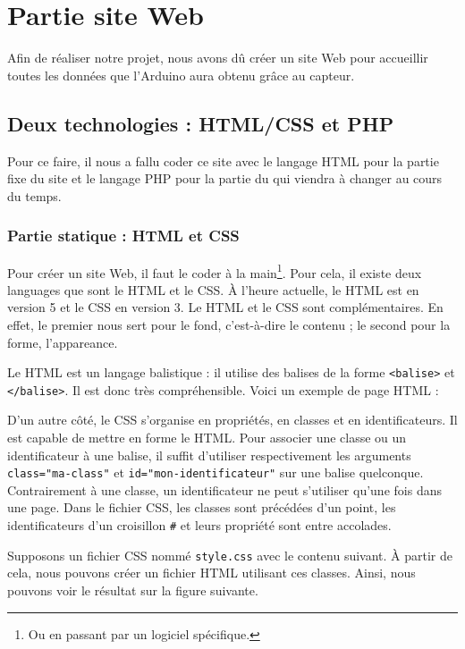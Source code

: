 \chapter{Partie site Web}

Afin de réaliser notre projet, nous avons dû créer un site Web pour accueillir toutes les données que l'Arduino aura obtenu grâce au capteur.

\section{Deux technologies : HTML/CSS et PHP}

Pour ce faire, il nous a fallu coder ce site avec le langage HTML pour la partie fixe du site et le langage PHP pour la partie du qui viendra à changer au cours du temps.

\subsection{Partie statique : HTML et CSS}

Pour créer un site Web, il faut le coder à la main\footnote{Ou en passant par un logiciel spécifique.}. Pour cela, il existe deux languages que sont le HTML et le CSS. À l'heure actuelle, le HTML est en version 5 et le CSS en version 3. Le HTML et le CSS sont complémentaires. En effet, le premier nous sert pour le fond, c'est-à-dire le contenu ; le second pour la forme, l'appareance.

Le HTML est un langage balistique : il utilise des balises de la forme \verb-<balise>- et \verb-</balise>-. Il est donc très compréhensible. Voici un exemple de page HTML :

\Espace

D'un autre côté, le CSS s'organise en propriétés, en classes et en identificateurs. Il est capable de mettre en forme le HTML. Pour associer une classe ou un identificateur à une balise, il suffit d'utiliser respectivement les arguments \verb/class="ma-class"/ et \verb/id="mon-identificateur"/ sur une balise quelconque. Contrairement à une classe, un identificateur ne peut s'utiliser qu'une fois dans une page. Dans le fichier CSS, les classes sont précédées d'un point, les identificateurs d'un croisillon \verb-#- et leurs propriété sont entre accolades.

Supposons un fichier CSS nommé \verb-style.css- avec le contenu suivant.
À partir de cela, nous pouvons créer un fichier HTML utilisant ces classes.
Ainsi, nous pouvons voir le résultat sur la figure suivante.

